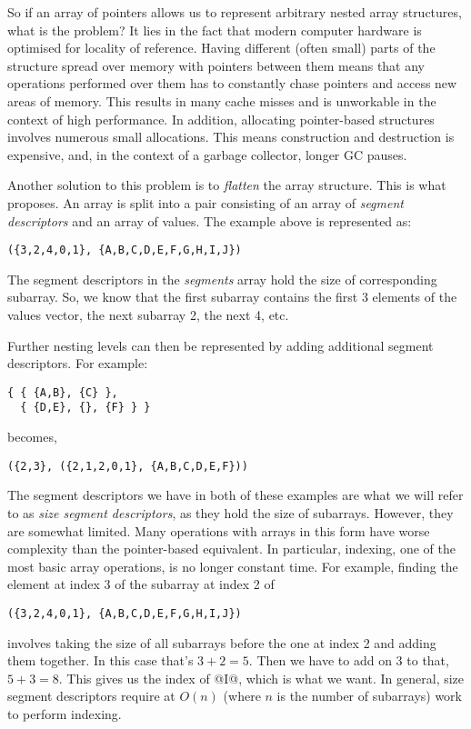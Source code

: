 So if an array of pointers allows us to represent arbitrary nested array structures, what is the problem? It lies in the fact that modern computer hardware is optimised for locality of reference. Having different (often small) parts of the structure spread over memory with pointers between them means that any operations performed over them has to constantly chase pointers and access new areas of memory. This results in many cache misses and is unworkable in the context of high performance. In addition, allocating pointer-based structures involves numerous small allocations. This means construction and destruction is expensive, and, in the context of a garbage collector, longer GC pauses.

Another solution to this problem is to \emph{flatten} the array structure. This is what \citet{Blelloch:compiling1988} proposes. An array is split into a pair consisting of an array of \emph{segment descriptors} and an array of values. The example above is represented as:
%
\begin{lstlisting}
({3,2,4,0,1}, {A,B,C,D,E,F,G,H,I,J})
\end{lstlisting}
%
The segment descriptors in the \emph{segments} array hold the size of corresponding subarray. So, we know that the first subarray contains the first 3 elements of the values vector, the next subarray 2, the next 4, etc.

Further nesting levels can then be represented by adding additional segment descriptors. For example:
%
\begin{lstlisting}
{ { {A,B}, {C} },
  { {D,E}, {}, {F} } }
\end{lstlisting}
%
becomes,
%
\begin{lstlisting}
({2,3}, ({2,1,2,0,1}, {A,B,C,D,E,F}))
\end{lstlisting}


The segment descriptors we have in both of these examples are what we will refer to as \emph{size segment descriptors}, as they hold the size of subarrays. However, they are somewhat limited. Many operations with arrays in this form have worse complexity than the pointer-based equivalent. In particular, indexing, one of the most basic array operations, is no longer constant time. For example, finding the element at index 3 of the subarray at index 2 of
%
\begin{lstlisting}
({3,2,4,0,1}, {A,B,C,D,E,F,G,H,I,J})
\end{lstlisting}
%
involves taking the size of all subarrays before the one at index 2 and adding them together. In this case that's $3+2=5$. Then we have to add on 3 to that, $5+3=8$. This gives us the index of @I@, which is what we want. In general, size segment descriptors require at $O(n)$ (where $n$ is the number of subarrays) work to perform indexing.

